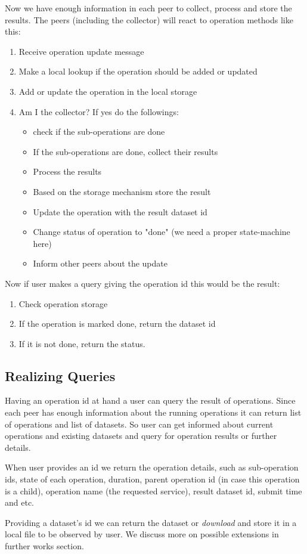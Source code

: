 Now we have enough information in each peer to collect, process and store the results. The peers (including the collector)
 will react to operation methods like this:

\begin{enumerate}
\item Receive operation update message
\item Make a local lookup if the operation should be added or updated
\item Add or update the operation in the local storage
\item Am I the collector? If yes do the followings:
\begin{itemize}
\item check if the sub-operations are done
\item If the sub-operations are done, collect their results
\item Process the results
\item Based on the storage mechanism store the result
\item Update the operation with the result dataset id
\item Change status of operation to "done" (we need a proper state-machine here)
\item Inform other peers about the update
\end{itemize}
\end{enumerate}

Now if user makes a query giving the operation id this would be the result:

\begin{enumerate}
\item Check operation storage
\item If the operation is marked done, return the dataset id
\item If it is not done, return the status.
\end{enumerate}

\fi

\subsection{Realizing Queries}
Having an operation id at hand a user can query the result of operations. 
Since each peer has enough information about the running operations it can return list of operations and list of datasets.
So user can get informed about current operations and existing datasets and query for operation results or further details.

When user provides an id we return the operation details, such as sub-operation ids, state of each operation,
duration, parent operation id (in case this operation is a child), operation name (the requested service), 
result dataset id, submit time and etc.

Providing a dataset's id we can return the dataset or \textit{download} and store it in a local file to be observed by user.
We discuss more on possible extensions in further works section.
